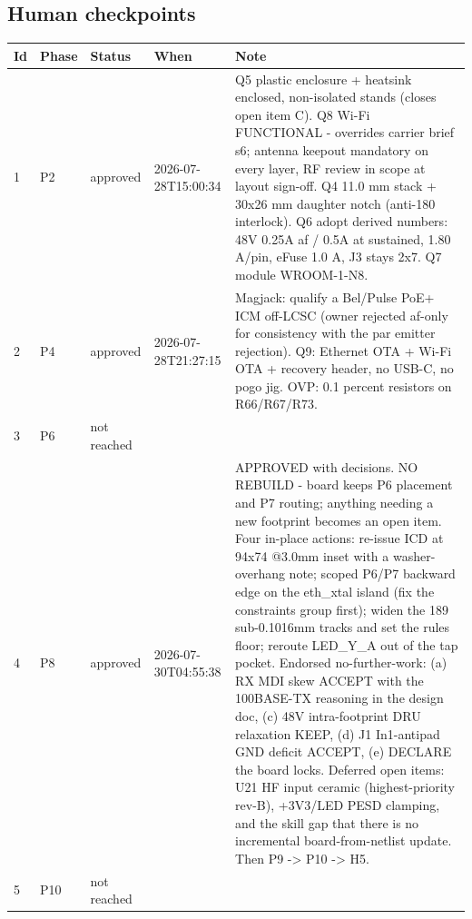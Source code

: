 \documentclass[11pt,a4paper]{article}
\begin{document}
\subsection*{Human checkpoints}
{\small
\begin{longtable}{lllp{2.6cm}p{6.4cm}}
\toprule
\textbf{Id} & \textbf{Phase} & \textbf{Status} & \textbf{When} & \textbf{Note} \\
\midrule
\endhead
1 & P2 & approved & 2026-07-28T15:00:34 & Q5 plastic enclosure + heatsink enclosed, non-isolated stands (closes open item C). Q8 Wi-Fi FUNCTIONAL - overrides carrier brief s6; antenna keepout mandatory on every layer, RF review in scope at layout sign-off. Q4 11.0 mm stack + 30x26 mm daughter notch (anti-180 interlock). Q6 adopt derived numbers: 48V 0.25A af / 0.5A at sustained, 1.80 A/pin, eFuse 1.0 A, J3 stays 2x7. Q7 module WROOM-1-N8. \\
2 & P4 & approved & 2026-07-28T21:27:15 & Magjack: qualify a Bel/Pulse PoE+ ICM off-LCSC (owner rejected af-only for consistency with the par emitter rejection). Q9: Ethernet OTA + Wi-Fi OTA + recovery header, no USB-C, no pogo jig. OVP: 0.1 percent resistors on R66/R67/R73. \\
3 & P6 & not reached &  &  \\
4 & P8 & approved & 2026-07-30T04:55:38 & APPROVED with decisions. NO REBUILD - board keeps P6 placement and P7 routing; anything needing a new footprint becomes an open item. Four in-place actions: re-issue ICD at 94x74 @3.0mm inset with a washer-overhang note; scoped P6/P7 backward edge on the eth\_xtal island (fix the constraints group first); widen the 189 sub-0.1016mm tracks and set the rules floor; reroute LED\_Y\_A out of the tap pocket. Endorsed no-further-work: (a) RX MDI skew ACCEPT with the 100BASE-TX reasoning in the design doc, (c) 48V intra-footprint DRU relaxation KEEP, (d) J1 In1-antipad GND deficit ACCEPT, (e) DECLARE the board locks. Deferred open items: U21 HF input ceramic (highest-priority rev-B), +3V3/LED PESD clamping, and the skill gap that there is no incremental board-from-netlist update. Then P9 -\textgreater{} P10 -\textgreater{} H5. \\
5 & P10 & not reached &  &  \\
\bottomrule
\end{longtable}
}
\end{document}
